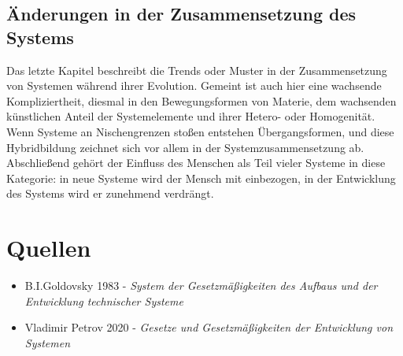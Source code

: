 \documentclass[a4paper,12pt]{article}
\begin{document}
\subsection{Änderungen in der Zusammensetzung des Systems}

Das letzte Kapitel beschreibt die Trends oder Muster in der Zusammensetzung von Systemen während ihrer Evolution. Gemeint ist auch hier eine wachsende Kompliziertheit, diesmal in den Bewegungsformen von Materie, dem wachsenden künstlichen Anteil der Systemelemente und ihrer Hetero- oder Homogenität. Wenn Systeme an Nischengrenzen stoßen entstehen Übergangsformen, und diese Hybridbildung zeichnet sich vor allem in der Systemzusammensetzung ab. Abschließend gehört der Einfluss des Menschen als Teil vieler Systeme in diese Kategorie: in neue Systeme wird der Mensch mit einbezogen, in der Entwicklung des Systems wird er zunehmend verdrängt.


\section{Quellen}
\begin{itemize}
\item B.I.Goldovsky 1983 - \emph{System der Gesetzmäßigkeiten des Aufbaus und der Entwicklung technischer Systeme}
\item Vladimir Petrov 2020 - \emph{Gesetze und Gesetzmäßigkeiten der Entwicklung von Systemen}
\end{itemize}
\end{document}

